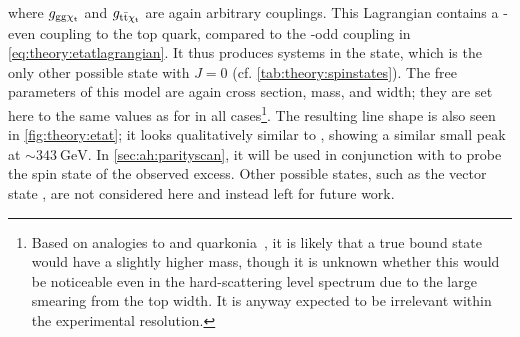 \noindent where $g_{\mathrm{gg} \mathrm{\chi_t}}$ and $g_{\mathrm{t \bar{t}} \mathrm{\chi_t}}$ are again arbitrary couplings. This Lagrangian contains a \CP-even coupling to the top quark, compared to the \CP-odd coupling in \cref{eq:theory:etatlagrangian}. It thus produces \ttbar systems in the  state, which is the only other possible state with $J = 0$ (cf. \cref{tab:theory:spinstates}). The free parameters of this model are again cross section, mass, and width; they are set here to the same values as for \etat in all cases\footnote{Based on analogies to \ccbar and \bbbar quarkonia~\cite{Barnes:2005pb}, it is likely that a true  bound state would have a slightly higher mass, though it is unknown whether this would be noticeable even in the hard-scattering level spectrum due to the large smearing from the top width. It is anyway expected to be irrelevant within the experimental resolution.}. The resulting \mWWbb line shape is also seen in \cref{fig:theory:etat}; it looks qualitatively similar to \etat, showing a similar small peak at $\sim \SI{343}{\GeV}$. In \cref{sec:ah:parityscan}, it will be used in conjunction with \etat to probe the spin state of the observed excess. Other possible states, such as the vector state , are not considered here and instead left for future work.








